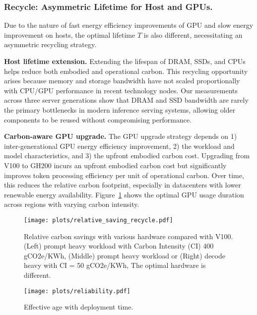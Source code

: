 \subsubsection{\textbf{Recycle: Asymmetric Lifetime for Host and GPUs.}}\label{sec:recycle}
Due to the nature of fast energy efficiency improvements of GPU and slow energy improvement on hosts, the optimal lifetime $T$ is also different, necessitating an asymmetric recycling strategy. 


\textbf{Host lifetime extension.}
Extending the lifespan of DRAM, SSDs, and CPUs helps reduce both embodied and operational carbon. This recycling opportunity arises because memory and storage bandwidth have not scaled proportionally with CPU/GPU performance in recent technology nodes. Our measurements across three server generations show that DRAM and SSD bandwidth are rarely the primary bottlenecks in modern inference serving systems, allowing older components to be reused without compromising performance.



\textbf{Carbon-aware GPU upgrade.} The GPU upgrade strategy depends on 1) inter-generational GPU energy efficiency improvement, 2) the workload and model characteristics, and 3) the upfront embodied carbon cost. Upgrading from V100 to GH200 incurs an upfront embodied carbon cost but significantly improves token processing efficiency per unit of operational carbon. Over time, this reduces the relative carbon footprint, especially in datacenters with lower renewable energy availability. Figure~\ref{fig:cf-relative} shows the optimal GPU usage duration across regions with varying carbon intensity.

\begin{figure}[t]
\centering
     \texttt{[image: plots/relative\_saving\_recycle.pdf]} \vspace{-1em}
    \caption{Relative carbon savings with various hardware compared with V100. (Left) prompt heavy workload with Carbon Intensity (CI)  400 gCO2e/KWh, (Middle) prompt heavy workload or  (Right) decode heavy with CI = 50 gCO2e/KWh, The optimal hardware is different. }\label{fig:cf-relative}
    \vspace{-1.05em}
\end{figure}
\begin{figure}[h]
    \centering
    \texttt{[image: plots/reliability.pdf]}
     \vspace{-1.05em}\caption{Effective age with deployment time.}
    \label{fig:reliability} \vspace{-1.05em}
\end{figure}

